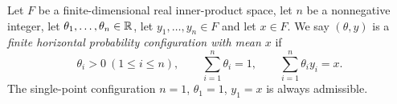 \begin{definition}
Let $F$ be a finite-dimensional real inner-product space, let $n$ be a
nonnegative integer, let $\theta_1,\ldots,\theta_n\in\mathbb{R}$, let
$y_1,\ldots,y_n\in F$ and let $x\in F$. We say $(\theta,y)$ is a \emph{finite
horizontal probability configuration with mean $x$} if
\[
  \theta_i>0\ (1\le i\le n),\qquad \sum_{i=1}^n\theta_i=1,\qquad
  \sum_{i=1}^n\theta_iy_i=x .
\]
The single-point configuration $n=1$, $\theta_1=1$, $y_1=x$ is always
admissible.
\end{definition}
